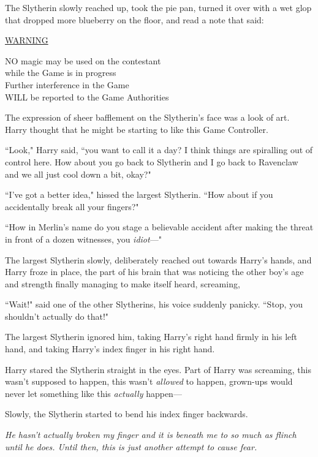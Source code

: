 The Slytherin slowly reached up, took the pie pan, turned it over with a wet glop that dropped more blueberry on the floor, and read a note that said:
\begin{writtenNote}
\MakeUppercase{\underline{Warning}}

\MakeUppercase{No} magic may be used on the contestant\\
while the Game is in progress\\
Further interference in the Game\\
\MakeUppercase{will} be reported to the Game Authorities
\end{writtenNote}

The expression of sheer bafflement on the Slytherin's face was a look of art. Harry thought that he might be starting to like this Game Controller.

``Look," Harry said, ``you want to call it a day? I think things are spiralling out of control here. How about you go back to Slytherin and I go back to Ravenclaw and we all just cool down a bit, okay?"

``I've got a better idea," hissed the largest Slytherin. ``How about if you accidentally break all your fingers?"

``How in Merlin's name do you stage a believable accident after making the threat in front of a dozen witnesses, you \emph{idiot}—"

The largest Slytherin slowly, deliberately reached out towards Harry's hands, and Harry froze in place, the part of his brain that was noticing the other boy's age and strength finally managing to make itself heard, screaming, 

``Wait!" said one of the other Slytherins, his voice suddenly panicky. ``Stop, you shouldn't actually do that!"

The largest Slytherin ignored him, taking Harry's right hand firmly in his left hand, and taking Harry's index finger in his right hand.

Harry stared the Slytherin straight in the eyes. Part of Harry was screaming, this wasn't supposed to happen, this wasn't \emph{allowed} to happen, grown-ups would never let something like this \emph{actually} happen—

Slowly, the Slytherin started to bend his index finger backwards.

\emph{He hasn't actually broken my finger and it is beneath me to so much as flinch until he does. Until then, this is just another attempt to cause fear.}

